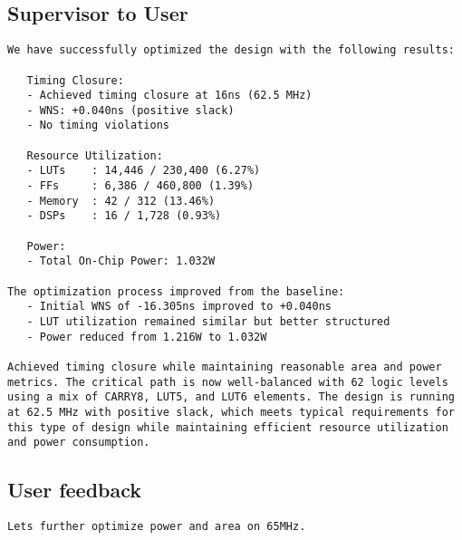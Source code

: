 \subsection{Supervisor to User}
\vspace{-0.5em}
\begin{supervisorbox}
\begin{lstlisting}
We have successfully optimized the design with the following results:

   Timing Closure:
   - Achieved timing closure at 16ns (62.5 MHz)
   - WNS: +0.040ns (positive slack)
   - No timing violations

   Resource Utilization:
   - LUTs    : 14,446 / 230,400 (6.27%)
   - FFs     : 6,386 / 460,800 (1.39%)
   - Memory  : 42 / 312 (13.46%)
   - DSPs    : 16 / 1,728 (0.93%)

   Power:
   - Total On-Chip Power: 1.032W

The optimization process improved from the baseline:
   - Initial WNS of -16.305ns improved to +0.040ns
   - LUT utilization remained similar but better structured
   - Power reduced from 1.216W to 1.032W

Achieved timing closure while maintaining reasonable area and power metrics. The critical path is now well-balanced with 62 logic levels using a mix of CARRY8, LUT5, and LUT6 elements. The design is running at 62.5 MHz with positive slack, which meets typical requirements for this type of design while maintaining efficient resource utilization and power consumption.
\end{lstlisting}
\end{supervisorbox}

\subsection{User feedback}
\vspace{-0.5em}
\begin{userbox}
\begin{lstlisting}
Lets further optimize power and area on 65MHz.
\end{lstlisting}
\end{userbox}


